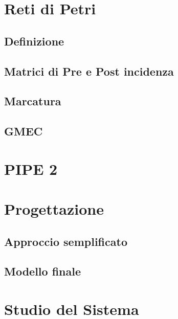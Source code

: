 \chapter{Reti di Petri}
\label{cap:cap1}
\lhead{\textbf{\rightmark}}

\newpage

\section{Definizione}
\label{sec:1.1}

\newpage

\section{Matrici di Pre e Post incidenza}
\label{sec:1.2}

\newpage

\section{Marcatura}
\label{sec:1.3}

\newpage

\section{GMEC}
\label{sec:1.4}

\newpage


\chapter{PIPE 2}
\label{cap:cap2}
\lhead{\textbf{\rightmark}}

\newpage


\chapter{Progettazione}
\label{cap:cap3}
\lhead{\textbf{\rightmark}}

\newpage

\section{Approccio semplificato}
\label{sec:3.1}

\newpage

\section{Modello finale}
\label{sec:3.2}

\newpage


\chapter{Studio del Sistema}
\label{cap:cap4}
\lhead{\textbf{\rightmark}}

\newpage